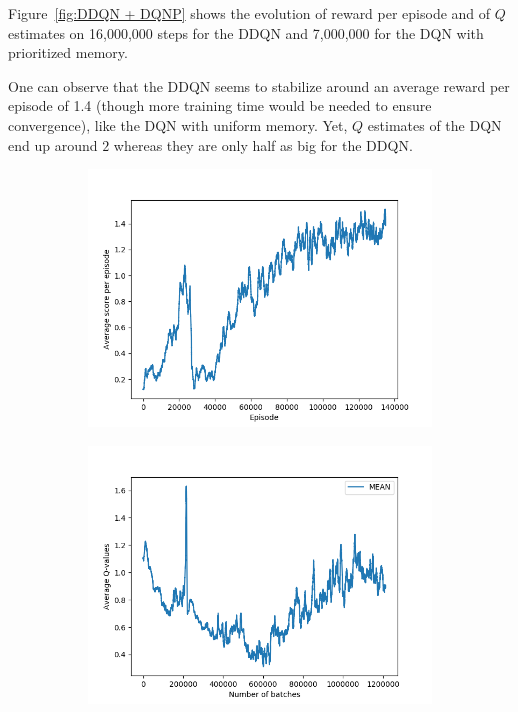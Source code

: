 \documentclass[letterpaper]{article}
\begin{document}
Figure~\ref{fig:DDQN + DQNP} shows the evolution of reward per episode and of $Q$ estimates on 16,000,000 steps for the DDQN and 7,000,000 for the DQN with
prioritized memory.

One can observe that the DDQN seems to stabilize around an average reward per episode of 1.4 (though more training time would be needed to ensure convergence),
like the DQN with uniform memory. Yet, $Q$ estimates of the DQN end up around $2$ whereas they are only half as big for the DDQN.

\begin{figure}[!t]
	\vspace{-1.5cm}
	\begin{subfigure}{.47\textwidth}
		\includegraphics[width=\textwidth]{figures/ddqn_uniform_e_scores}
	\end{subfigure}
	\hfill
	\begin{subfigure}{.47\textwidth}
		\includegraphics[width=\textwidth]{figures/ddqn_uniform_q_values}

\end{subfigure}
\end{figure}
\end{document}
